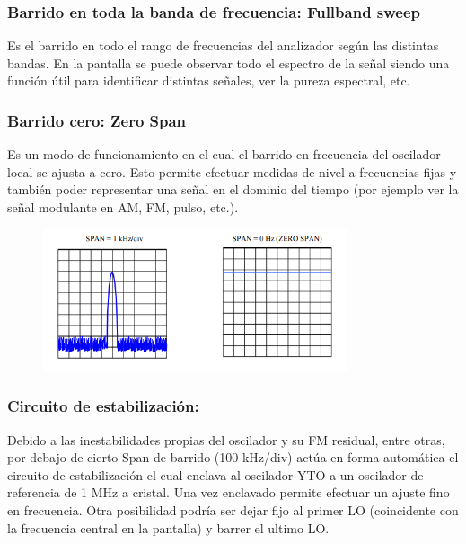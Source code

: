 \documentclass[a4paper,12pt,twoside]{article}
\begin{document}
\subsubsection{Barrido en toda la banda de frecuencia: Fullband sweep}

Es el barrido en todo el rango de frecuencias del analizador según las distintas bandas. En la
pantalla se puede observar todo el espectro de la señal siendo una función útil para identificar
distintas señales, ver la pureza espectral, etc. 

\subsubsection{ Barrido cero: Zero Span}
Es un modo de funcionamiento en el cual el barrido en frecuencia del oscilador local se ajusta a
cero. Esto permite efectuar medidas de nivel a frecuencias fijas y también poder representar una
señal en el dominio del tiempo (por ejemplo ver la señal modulante en AM, FM, pulso, etc.). 

\begin{figure}[H]
    \centering
    \includegraphics[width=0.8\textwidth]{../img/span.png}
\end{figure}

\subsubsection{Circuito de estabilización:}

Debido a las inestabilidades propias del oscilador y su FM residual, entre otras, por debajo de
cierto Span de barrido (100 kHz/div) actúa en forma automática el circuito de estabilización el
cual enclava al oscilador YTO a un oscilador de referencia de 1 MHz a cristal. Una vez
enclavado permite efectuar un ajuste fino en frecuencia.
Otra posibilidad podría ser dejar fijo al primer LO (coincidente con la frecuencia central en la
pantalla) y barrer el ultimo LO.
\end{document}
